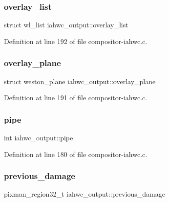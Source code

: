 \subsubsection{\texorpdfstring{overlay\+\_\+list}{overlay\_list}}
{\footnotesize\ttfamily struct wl\+\_\+list iahwc\+\_\+output\+::overlay\+\_\+list}



Definition at line 192 of file compositor-\/iahwc.\+c.

\mbox{\label{structiahwc__output_a2f4e89c3089e28c38b9eda40293e8b62}} 
\subsubsection{\texorpdfstring{overlay\+\_\+plane}{overlay\_plane}}
{\footnotesize\ttfamily struct weston\+\_\+plane iahwc\+\_\+output\+::overlay\+\_\+plane}



Definition at line 191 of file compositor-\/iahwc.\+c.

\mbox{\label{structiahwc__output_a34e4e1b6d16a36451f45dcd44de71592}} 
\subsubsection{\texorpdfstring{pipe}{pipe}}
{\footnotesize\ttfamily int iahwc\+\_\+output\+::pipe}



Definition at line 180 of file compositor-\/iahwc.\+c.

\mbox{\label{structiahwc__output_a853f609b7a945b51ced6349755d9261c}} 
\subsubsection{\texorpdfstring{previous\+\_\+damage}{previous\_damage}}
{\footnotesize\ttfamily pixman\+\_\+region32\+\_\+t iahwc\+\_\+output\+::previous\+\_\+damage}



